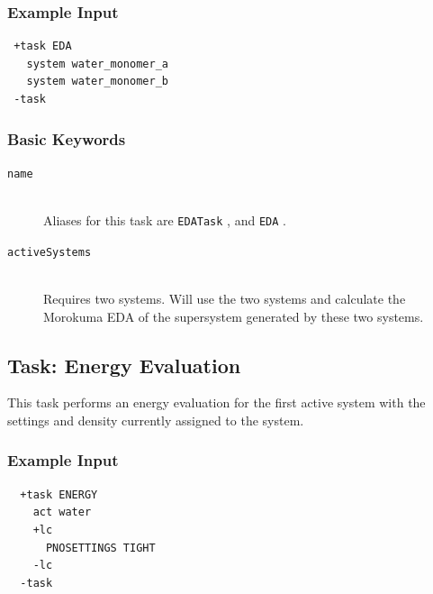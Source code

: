 \documentclass[bibliography=totocnumbered,a4paper,10pt,oneside]{scrbook}
\newcommand{\ttt}[1]{%
  \begingroup\setlength{\fboxsep}{1pt}%
  \colorbox{serenity-green!30}{\texttt{\hspace*{2pt}\vphantom{(g}#1\hspace*{2pt}}}%
  \endgroup
}
\begin{document}
\subsubsection{Example Input}
\begin{lstlisting}
 +task EDA
   system water_monomer_a
   system water_monomer_b
 -task
\end{lstlisting}
\subsubsection{Basic Keywords}
\begin{description}
  \item [\texttt{name}]\hfill \\
    Aliases for this task are \ttt{EDATask},  and \ttt{EDA}.
  \item [\texttt{activeSystems}]\hfill \\
    Requires two systems. Will use the two systems and calculate the Morokuma EDA of the supersystem 
    generated by these two systems.
\end{description}


\subsection{Task: Energy Evaluation}
This task performs an energy evaluation for the first active system with the settings
and density currently assigned to the system.
\subsubsection{Example Input}
\begin{lstlisting}
  +task ENERGY
    act water
    +lc
      PNOSETTINGS TIGHT
    -lc
  -task
\end{lstlisting}
\end{document}
